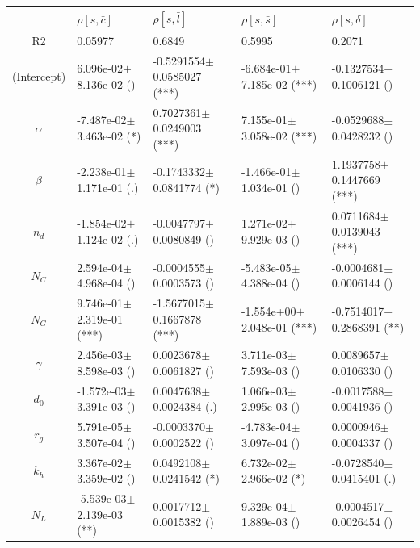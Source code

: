 \begin{center}
\begin{tabular}{|c|p{3.7cm}|p{3.7cm}|p{3.7cm}|p{3.7cm}|}
 \hline
&$\rho[s,\bar{c}]$&$\rho[s,\bar{l}]$&$\rho[s,\bar{s}]$&$\rho[s,\delta]$\\\hline
R2&0.05977&0.6849&0.5995&0.2071\\\hline
(Intercept)&6.096e-02$\pm$8.136e-02 ()&-0.5291554$\pm$0.0585027 (***)&-6.684e-01$\pm$7.185e-02 (***)&-0.1327534$\pm$0.1006121 ()\\
$\alpha$&-7.487e-02$\pm$3.463e-02 (*)&0.7027361$\pm$0.0249003 (***)&7.155e-01$\pm$3.058e-02 (***)&-0.0529688$\pm$0.0428232 ()\\
$\beta$&-2.238e-01$\pm$1.171e-01 (.)&-0.1743332$\pm$0.0841774 (*)&-1.466e-01$\pm$1.034e-01 ()&1.1937758$\pm$0.1447669 (***)\\
$n_d$&-1.854e-02$\pm$1.124e-02 (.)&-0.0047797$\pm$0.0080849 ()&1.271e-02$\pm$9.929e-03 ()&0.0711684$\pm$0.0139043 (***)\\
$N_C$&2.594e-04$\pm$4.968e-04 ()&-0.0004555$\pm$0.0003573 ()&-5.483e-05$\pm$4.388e-04 ()&-0.0004681$\pm$0.0006144 ()\\
$N_G$&9.746e-01$\pm$2.319e-01 (***)&-1.5677015$\pm$0.1667878 (***)&-1.554e+00$\pm$2.048e-01 (***)&-0.7514017$\pm$0.2868391 (**)\\
$\gamma$&2.456e-03$\pm$8.598e-03 ()&0.0023678$\pm$0.0061827 ()&3.711e-03$\pm$7.593e-03 ()&0.0089657$\pm$0.0106330 ()\\
$d_0$&-1.572e-03$\pm$3.391e-03 ()&0.0047638$\pm$0.0024384 (.)&1.066e-03$\pm$2.995e-03 ()&-0.0017588$\pm$0.0041936 ()\\
$r_g$&5.791e-05$\pm$3.507e-04 ()&-0.0003370$\pm$0.0002522 ()&-4.783e-04$\pm$3.097e-04 ()&0.0000946$\pm$0.0004337 ()\\
$k_h$&3.367e-02$\pm$3.359e-02 ()&0.0492108$\pm$0.0241542 (*)&6.732e-02$\pm$2.966e-02 (*)&-0.0728540$\pm$0.0415401 (.)\\
$N_L$&-5.539e-03$\pm$2.139e-03 (**)&0.0017712$\pm$0.0015382 ()&9.329e-04$\pm$1.889e-03 ()&-0.0004517$\pm$0.0026454 ()\\
\hline
\end{tabular}

\bigskip


\end{center}
